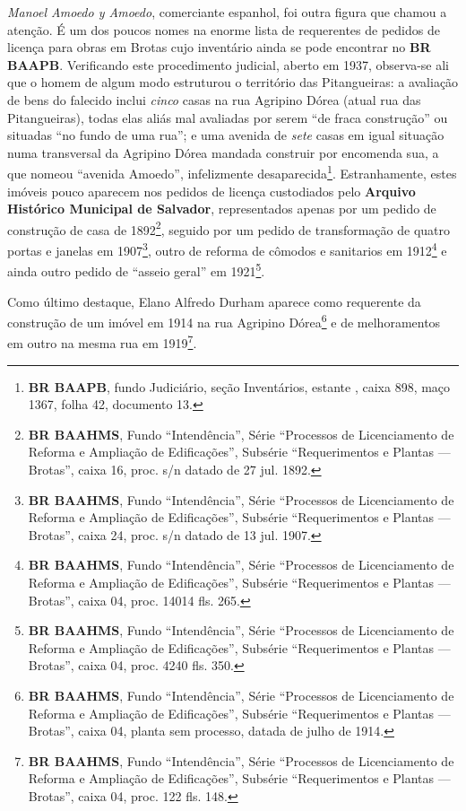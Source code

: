 \textit{Manoel Amoedo y Amoedo}, comerciante espanhol, foi outra figura que chamou a atenção. É um dos poucos nomes na enorme lista de requerentes de pedidos de licença para obras em Brotas cujo inventário ainda se pode encontrar no \textbf{BR BAAPB}. Verificando este procedimento judicial, aberto em 1937, observa-se ali que o homem de algum modo estruturou o território das Pitangueiras: a avaliação de bens do falecido inclui \textit{cinco} casas na rua Agripino Dórea (atual rua das Pitangueiras), todas elas aliás mal avaliadas por serem ``de fraca construção'' ou situadas ``no fundo de uma rua''; e uma avenida de \textit{sete} casas em igual situação numa transversal da Agripino Dórea mandada construir por encomenda sua, a que nomeou ``avenida Amoedo'', infelizmente desaparecida\footnote{\textbf{BR BAAPB}, fundo Judiciário, seção Inventários, estante , caixa 898, maço 1367, folha 42, documento 13.}. Estranhamente, estes imóveis pouco aparecem nos pedidos de licença custodiados pelo \textbf{Arquivo Histórico Municipal de Salvador}, representados apenas por um pedido de construção de casa de 1892\footnote{\textbf{BR BAAHMS}, Fundo ``Intendência'', Série ``Processos de Licenciamento de Reforma e Ampliação de Edificações'', Subsérie ``Requerimentos e Plantas --- Brotas'', caixa 16, proc. s/n datado de 27 jul. 1892.}, seguido por um pedido de transformação de quatro portas e janelas em 1907\footnote{\textbf{BR BAAHMS}, Fundo ``Intendência'', Série ``Processos de Licenciamento de Reforma e Ampliação de Edificações'', Subsérie ``Requerimentos e Plantas --- Brotas'', caixa 24, proc. s/n datado de 13 jul. 1907.}, outro de reforma de cômodos e sanitarios em 1912\footnote{\textbf{BR BAAHMS}, Fundo ``Intendência'', Série ``Processos de Licenciamento de Reforma e Ampliação de Edificações'', Subsérie ``Requerimentos e Plantas --- Brotas'', caixa 04, proc. 14014 fls. 265.} e ainda outro pedido de ``asseio geral'' em 1921\footnote{\textbf{BR BAAHMS}, Fundo ``Intendência'', Série ``Processos de Licenciamento de Reforma e Ampliação de Edificações'', Subsérie ``Requerimentos e Plantas --- Brotas'', caixa 04, proc. 4240 fls. 350.}.

Como último destaque, Elano Alfredo Durham aparece como requerente da construção de um imóvel em 1914 na rua Agripino Dórea\footnote{\textbf{BR BAAHMS}, Fundo ``Intendência'', Série ``Processos de Licenciamento de Reforma e Ampliação de Edificações'', Subsérie ``Requerimentos e Plantas --- Brotas'', caixa 04, planta sem processo, datada de julho de 1914.} e de melhoramentos em outro na mesma rua em 1919\footnote{\textbf{BR BAAHMS}, Fundo ``Intendência'', Série ``Processos de Licenciamento de Reforma e Ampliação de Edificações'', Subsérie ``Requerimentos e Plantas --- Brotas'', caixa 04, proc. 122 fls. 148.}.

